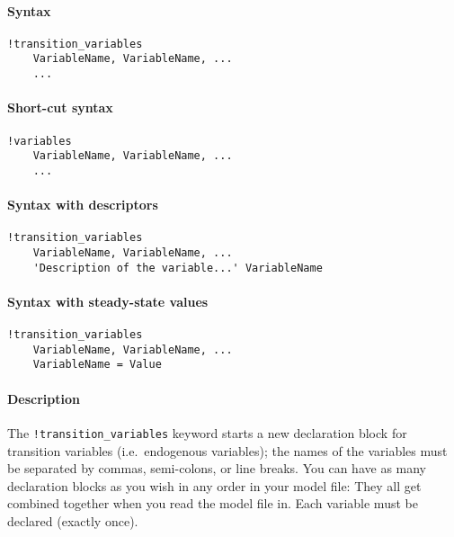


	\paragraph{Syntax}

\begin{verbatim}
!transition_variables
    VariableName, VariableName, ...
    ...
\end{verbatim}

\paragraph{Short-cut syntax}

\begin{verbatim}
!variables
    VariableName, VariableName, ...
    ...
\end{verbatim}

\paragraph{Syntax with descriptors}

\begin{verbatim}
!transition_variables
    VariableName, VariableName, ...
    'Description of the variable...' VariableName
\end{verbatim}

\paragraph{Syntax with steady-state
values}

\begin{verbatim}
!transition_variables
    VariableName, VariableName, ...
    VariableName = Value
\end{verbatim}

\paragraph{Description}

The \texttt{!transition\_variables} keyword starts a new declaration
block for transition variables (i.e.~endogenous variables); the names of
the variables must be separated by commas, semi-colons, or line breaks.
You can have as many declaration blocks as you wish in any order in your
model file: They all get combined together when you read the model file
in. Each variable must be declared (exactly once).

